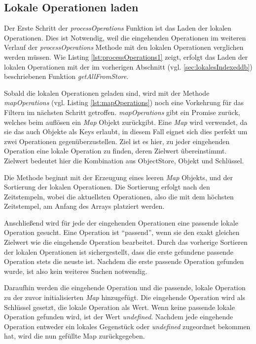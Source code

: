 \documentclass[a4paper, 12pt]{scrreprt}
\begin{document}
\subsection{Lokale Operationen laden}

Der Erste Schritt der \textit{processOperations} Funktion ist das Laden der lokalen Operationen. Dies ist Notwendig, weil die eingehenden Operationen im weiteren Verlauf der \textit{processOperations} Methode mit den lokalen Operationen verglichen werden müssen. Wie Listing \ref{lst:processOperations1} zeigt, erfolgt das Laden der lokalen Operationen mit der im vorherigen Abschnitt (vgl. \ref{sec:lokalesIndexeddb}) beschriebenen Funktion \textit{getAllFromStore}.

\begin{minipage}{\linewidth}
	
\end{minipage}

Sobald die lokalen Operationen geladen sind, wird mit der Methode \textit{mapOperations} (vgl. Listing \ref{lst:mapOperations}) noch eine Vorkehrung für das Filtern im nächsten Schritt getroffen. \textit{mapOperations} gibt ein Promise zurück, welches beim auflösen ein \textit{Map} Objekt zurückgibt. Eine \textit{Map} wird verwendet, da sie das auch Objekte als Keys erlaubt, in diesem Fall eignet sich dies perfekt um zwei Operationen gegenüberzustellen. Ziel ist es hier, zu jeder eingehenden Operation eine lokale Operation zu finden, deren Zielwert übereinstimmt. Zielwert bedeutet hier die Kombination aus ObjectStore, Objekt und Schlüssel. 

Die Methode beginnt mit der Erzeugung eines leeren \textit{Map} Objekts, und der Sortierung der lokalen Operationen. Die Sortierung erfolgt nach den Zeitstempeln, wobei die aktuellsten Operationen, also die mit dem höchsten Zeitstempel, am Anfang des Arrays platziert werden. 

Anschließend wird für jede der eingehenden Operationen eine passende lokale Operation gesucht. Eine Operation ist \enquote{passend}, wenn sie den exakt gleichen Zielwert wie die eingehende Operation bearbeitet. Durch das vorherige Sortieren der lokalen Operationen ist sichergestellt, dass die erste gefundene passende Operation stets die neuste ist. Nachdem die erste passende Operation gefunden wurde, ist also kein weiteres Suchen notwendig.

Daraufhin werden die eingehende Operation und die passende, lokale Operation zu der zuvor initialisierten \textit{Map} hinzugefügt. Die eingehende Operation wird als Schlüssel gesetzt, die lokale Operation als Wert. Wenn keine passende lokale Operation gefunden wird, ist der Wert \textit{undefined}. Nachdem jede eingehende Operation entweder ein lokales Gegenstück oder \textit{undefined} zugeordnet bekommen hat, wird die nun gefüllte Map zurückgegeben. 
\end{document}
